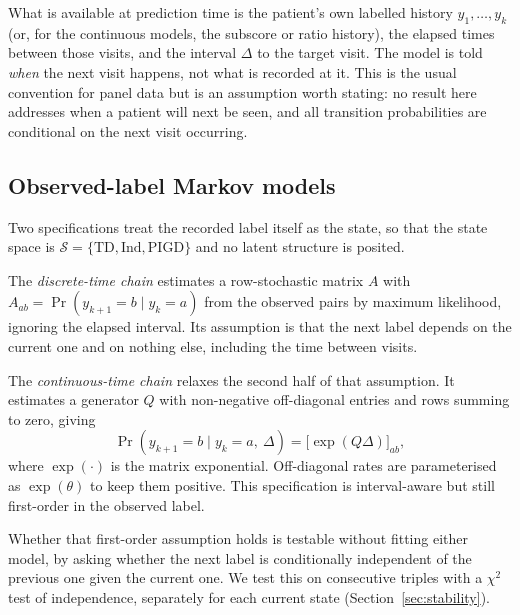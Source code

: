 \documentclass[11pt]{article}
\newcommand{\TD}{\mathrm{TD}}
\newcommand{\PIGD}{\mathrm{PIGD}}
\newcommand{\Ind}{\mathrm{Ind}}
\begin{document}
What is available at prediction time is the patient's own labelled history
$y_1,\dots,y_k$ (or, for the continuous models, the subscore or ratio history),
the elapsed times between those visits, and the interval $\Delta$ to the target
visit. The model is told \emph{when} the next visit happens, not what is
recorded at it. This is the usual convention for panel data but is an assumption
worth stating: no result here addresses when a patient will next be seen, and
all transition probabilities are conditional on the next visit occurring.

\subsection{Observed-label Markov models}
Two specifications treat the recorded label itself as the state, so that the
state space is $\mathcal{S} = \{\TD, \Ind, \PIGD\}$ and no latent structure is
posited.

The \emph{discrete-time chain} estimates a row-stochastic matrix $A$ with
$A_{ab} = \Pr(y_{k+1} = b \mid y_k = a)$ from the observed pairs by maximum
likelihood, ignoring the elapsed interval. Its assumption is that the next label
depends on the current one and on nothing else, including the time between
visits.

The \emph{continuous-time chain} relaxes the second half of that assumption. It
estimates a generator $Q$ with non-negative off-diagonal entries and rows
summing to zero, giving
\begin{equation}
\Pr(y_{k+1} = b \mid y_k = a,\ \Delta) = \bigl[\exp(Q\Delta)\bigr]_{ab},
\label{eq:ctmc}
\end{equation}
where $\exp(\cdot)$ is the matrix exponential. Off-diagonal rates are
parameterised as $\exp(\theta)$ to keep them positive. This specification is
interval-aware but still first-order in the observed label.

Whether that first-order assumption holds is testable without fitting either
model, by asking whether the next label is conditionally independent of the
previous one given the current one. We test this on consecutive triples with a
$\chi^2$ test of independence, separately for each current state
(Section~\ref{sec:stability}).
\end{document}
